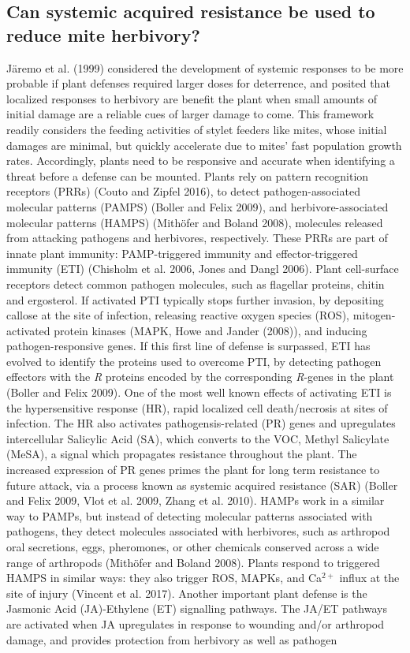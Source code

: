 \documentclass[12pt,final,CPage]{ufthesis}
\begin{document}
{  \hypertarget{sar-litrev}{%
  \subsection{Can systemic acquired resistance be used to reduce mite herbivory?}\label{sar-litrev}}

  Järemo et al. (1999) considered the development of systemic responses to be more probable if plant defenses required larger doses for deterrence, and posited that localized responses to herbivory are benefit the plant when small amounts of initial damage are a reliable cues of larger damage to come. This framework readily considers the feeding activities of stylet feeders like mites, whose initial damages are minimal, but quickly accelerate due to mites' fast population growth rates. Accordingly, plants need to be responsive and accurate when identifying a threat before a defense can be mounted. Plants rely on pattern recognition receptors (PRRs) (Couto and Zipfel 2016), to detect pathogen-associated molecular patterns (PAMPS) (Boller and Felix 2009), and herbivore-associated molecular patterns (HAMPS) (Mithöfer and Boland 2008), molecules released from attacking pathogens and herbivores, respectively. These PRRs are part of innate plant immunity: PAMP-triggered immunity and effector-triggered immunity (ETI) (Chisholm et al. 2006, Jones and Dangl 2006). Plant cell-surface receptors detect common pathogen molecules, such as flagellar proteins, chitin and ergosterol. If activated PTI typically stops further invasion, by depositing callose at the site of infection, releasing reactive oxygen species (ROS), mitogen-activated protein kinases (MAPK, Howe and Jander (2008)), and inducing pathogen-responsive genes. If this first line of defense is surpassed, ETI has evolved to identify the proteins used to overcome PTI, by detecting pathogen effectors with the \emph{R} proteins encoded by the corresponding \emph{R}-genes in the plant (Boller and Felix 2009). One of the most well known effects of activating ETI is the hypersensitive response (HR), rapid localized cell death/necrosis at sites of infection. The HR also activates pathogensis-related (PR) genes and upregulates intercellular Salicylic Acid (SA), which converts to the VOC, Methyl Salicylate (MeSA), a signal which propagates resistance throughout the plant. The increased expression of PR genes primes the plant for long term resistance to future attack, via a process known as systemic acquired resistance (SAR) (Boller and Felix 2009, Vlot et al. 2009, Zhang et al. 2010). HAMPs work in a similar way to PAMPs, but instead of detecting molecular patterns associated with pathogens, they detect molecules associated with herbivores, such as arthropod oral secretions, eggs, pheromones, or other chemicals conserved across a wide range of arthropods (Mithöfer and Boland 2008). Plants respond to triggered HAMPS in similar ways: they also trigger ROS, MAPKs, and Ca\({^{2+}}\) influx at the site of injury (Vincent et al. 2017). Another important plant defense is the Jasmonic Acid (JA)-Ethylene (ET) signalling pathways. The JA/ET pathways are activated when JA upregulates in response to wounding and/or arthropod damage, and provides protection from herbivory as well as pathogen }
\end{document}
